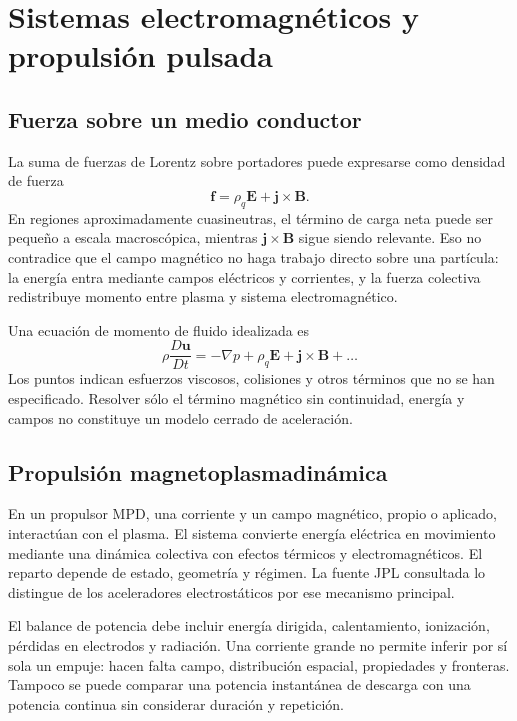 \chapter{Sistemas electromagnéticos y propulsión pulsada}\label{ch:24}
\section{Fuerza sobre un medio conductor}
La suma de fuerzas de Lorentz sobre portadores puede expresarse como densidad de fuerza
\[
 \mathbf f=\rho_q\mathbf E+\mathbf j\times\mathbf B.
\]
En regiones aproximadamente cuasineutras, el término de carga neta puede ser pequeño a escala macroscópica, mientras $\mathbf j\times\mathbf B$ sigue siendo relevante. Eso no contradice que el campo magnético no haga trabajo directo sobre una partícula: la energía entra mediante campos eléctricos y corrientes, y la fuerza colectiva redistribuye momento entre plasma y sistema electromagnético.

Una ecuación de momento de fluido idealizada es
\[
 \rho\frac{D\mathbf u}{Dt}=-\nabla p+\rho_q\mathbf E+\mathbf j\times\mathbf B+\ldots
\]
Los puntos indican esfuerzos viscosos, colisiones y otros términos que no se han especificado. Resolver sólo el término magnético sin continuidad, energía y campos no constituye un modelo cerrado de aceleración.
\section{Propulsión magnetoplasmadinámica}
En un propulsor MPD, una corriente y un campo magnético, propio o aplicado, interactúan con el plasma. El sistema convierte energía eléctrica en movimiento mediante una dinámica colectiva con efectos térmicos y electromagnéticos. El reparto depende de estado, geometría y régimen. La fuente JPL consultada lo distingue de los aceleradores electrostáticos por ese mecanismo principal.\cite{JPL-EP}

El balance de potencia debe incluir energía dirigida, calentamiento, ionización, pérdidas en electrodos y radiación. Una corriente grande no permite inferir por sí sola un empuje: hacen falta campo, distribución espacial, propiedades y fronteras. Tampoco se puede comparar una potencia instantánea de descarga con una potencia continua sin considerar duración y repetición.
